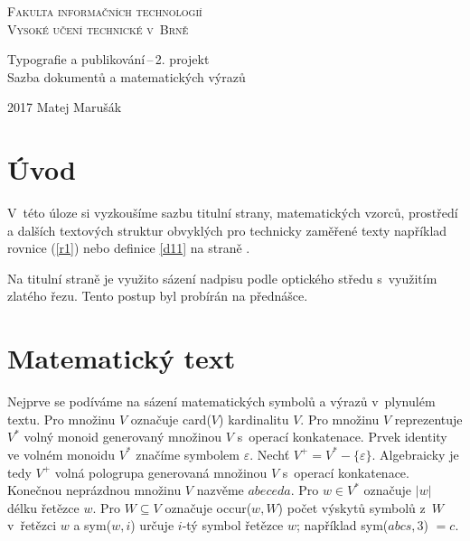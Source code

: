 \documentclass[a4paper, 11pt, twocolumn] {article}
\begin{document}
\begin{titlepage}
\begin{center}

\newtheorem{definicia}{Definice}[section]
\newtheorem{algoritmus}[definicia]{Algoritmus}
\newtheorem{veta}{Věta}



{\Huge \textsc{Fakulta informačních technologií\\
Vysoké učení technické v~Brně}}\\


{\LARGE
	Typografie a publikování\,--\,2. projekt\\
	Sazba dokumentů a matematických výrazů\\
}

\end{center}

{\LARGE 2017    \hfill     Matej Marušák}
\end{titlepage}


\section*{Úvod}
V~této úloze si vyzkoušíme sazbu titulní strany, matematických vzorců, prostředí a dalších textových struktur obvyklých pro technicky zaměřené texty například rovnice (\ref{r1}) nebo definice \ref{d11} na straně \pageref{d11}.

Na titulní straně je využito sázení nadpisu podle optického středu s~využitím zlatého řezu. Tento postup byl probírán na přednášce.


\section{Matematický text}

Nejprve se podíváme na sázení matematických symbolů a výrazů v~plynulém textu. Pro množinu $V$ označuje card($V$) kardinalitu $V$.
Pro množinu $V$ reprezentuje $V^*$ volný monoid generovaný množinou $V$ s~operací konkatenace.
Prvek identity ve volném monoidu $V^*$ značíme symbolem $\varepsilon$.
Nechť $V^+ = V^* - \{\varepsilon\}$. Algebraicky je tedy $V^+$ volná pologrupa generovaná množinou $V$ s~operací konkatenace.
Konečnou neprázdnou množinu $V$ nazvěme $abeceda$.
Pro $w \in  V^*$ označuje $|w|$ délku řetězce $w$. Pro $W \subseteq V$ označuje occur($w,W$) počet výskytů symbolů z~$W$ v~řetězci $w$ a sym($w, i$) určuje $i$-tý symbol řetězce $w$; například sym($abcs, 3$) $=c$.
\end{document}
